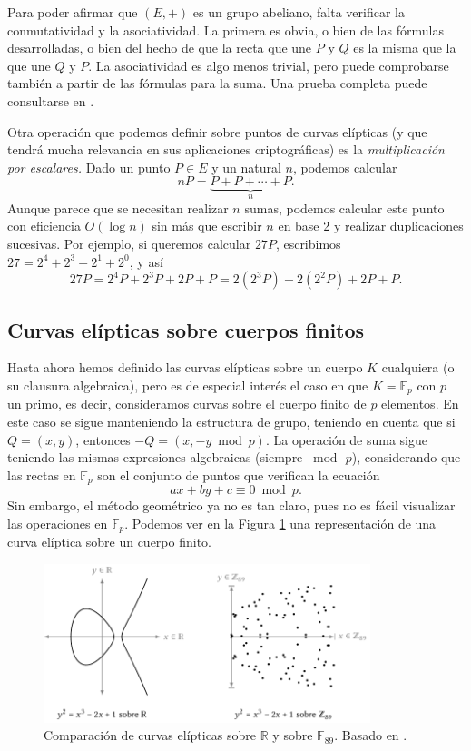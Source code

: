 \documentclass[
  a4paper,
  12pt,
  spanish,
]{scrartcl}
\begin{document}
    Para poder afirmar que $(E, +)$ es un grupo abeliano, falta verificar la conmutatividad y la asociatividad. La primera es obvia, o bien de las fórmulas desarrolladas, o bien del hecho de que la recta que une $P$ y $Q$ es la misma que la que une $Q$ y $P$. La asociatividad es algo menos trivial, pero puede comprobarse también a partir de las fórmulas para la suma. Una prueba completa puede consultarse en \parencite[sección 2.4]{elliptic_washington_2008}.

    Otra operación que podemos definir sobre puntos de curvas elípticas (y que tendrá mucha relevancia en sus aplicaciones criptográficas) es la \textit{multiplicación por escalares.} Dado un punto $P\in E$ y un natural $n$, podemos calcular \[ nP = \underbrace{P + P + \cdots + P}_{n}.\] Aunque parece que se necesitan realizar $n$ sumas, podemos calcular este punto con eficiencia $O(\log n)$ sin más que escribir $n$ en base 2 y realizar duplicaciones sucesivas. Por ejemplo, si queremos calcular $27P$, escribimos $27 = 2^4 + 2^3 + 2^1 + 2^0$, y así \[ 27P = 2^4P + 2^3P + 2P + P = 2(2^3P) + 2(2^2P) + 2P + P.\]

\subsection{Curvas elípticas sobre cuerpos finitos}

Hasta ahora hemos definido las curvas elípticas sobre un cuerpo $K$ cualquiera (o su clausura algebraica), pero es de especial interés el caso en que $K=\mathbb{F}_p$ con $p$ un primo, es decir, consideramos curvas sobre el cuerpo finito de $p$ elementos. En este caso se sigue manteniendo la estructura de grupo, teniendo en cuenta que si $Q = (x,y)$, entonces $-Q = (x, -y \bmod p)$. La operación de suma sigue teniendo las mismas expresiones algebraicas (siempre $\bmod\, p$), considerando que las rectas en $\mathbb{F}_p$ son el conjunto de puntos que verifican la ecuación \[ ax + by + c \equiv 0 \bmod p. \] Sin embargo, el método geométrico ya no es tan claro, pues no es fácil visualizar las operaciones en $\mathbb{F}_p$. Podemos ver en la Figura \ref{fig:cuerpos-curvas} una representación de una curva elíptica sobre un cuerpo finito.

\begin{figure}[h]
  \centering
  \includegraphics[width=0.85\textwidth]{img/cuerpos-curvas}
	\caption{Comparación de curvas elípticas sobre $\mathbb{R}$ y sobre $\mathbb{F}_{89}$. Basado en \parencite{eichlseder_elliptic_2016}.}
  \label{fig:cuerpos-curvas}
\end{figure}
\end{document}
